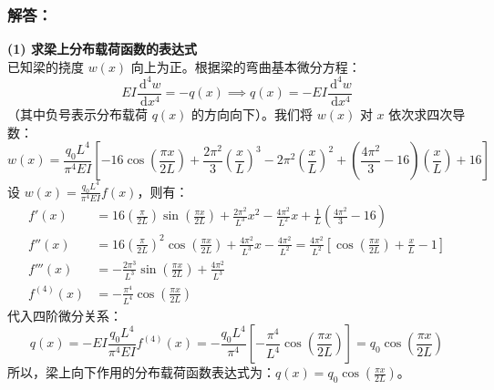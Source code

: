 \documentclass[11pt,a4paper]{ctexrep}
\newcommand{\diff}{\,\mathrm{d}}
\begin{document}
{\begin{center}
\end{center}

\subsubsection*{解答：}

\textbf{(1) 求梁上分布载荷函数的表达式} \\
已知梁的挠度 $w(x)$ 向上为正。根据梁的弯曲基本微分方程：
\[
    EI \frac{\diff^4 w}{\diff x^4} = -q(x) \implies q(x) = -EI \frac{\diff^4 w}{\diff x^4}
\]
（其中负号表示分布载荷 $q(x)$ 的方向向下）。我们将 $w(x)$ 对 $x$ 依次求四次导数：
\[
    w(x) = \frac{q_0 L^4}{\pi^4 EI} \left[ -16 \cos\left(\frac{\pi x}{2L}\right) + \frac{2\pi^2}{3}\left(\frac{x}{L}\right)^3 - 2\pi^2\left(\frac{x}{L}\right)^2 + \left(\frac{4\pi^2}{3} - 16\right)\left(\frac{x}{L}\right) + 16 \right]
\]
设 $w(x) = \frac{q_0 L^4}{\pi^4 EI} f(x)$，则有：
\begin{align*}
    f'(x) &= 16 \left(\frac{\pi}{2L}\right) \sin\left(\frac{\pi x}{2L}\right) + \frac{2\pi^2}{L^3} x^2 - \frac{4\pi^2}{L^2} x + \frac{1}{L}\left(\frac{4\pi^2}{3} - 16\right) \\
    f''(x) &= 16 \left(\frac{\pi}{2L}\right)^2 \cos\left(\frac{\pi x}{2L}\right) + \frac{4\pi^2}{L^3} x - \frac{4\pi^2}{L^2} = \frac{4\pi^2}{L^2}\left[ \cos\left(\frac{\pi x}{2L}\right) + \frac{x}{L} - 1 \right] \\
    f'''(x) &= -\frac{2\pi^3}{L^3} \sin\left(\frac{\pi x}{2L}\right) + \frac{4\pi^2}{L^3} \\
    f^{(4)}(x) &= -\frac{\pi^4}{L^4} \cos\left(\frac{\pi x}{2L}\right)
\end{align*}
代入四阶微分关系：
\[
    q(x) = -EI \frac{q_0 L^4}{\pi^4 EI} f^{(4)}(x) = -\frac{q_0 L^4}{\pi^4} \left[ -\frac{\pi^4}{L^4} \cos\left(\frac{\pi x}{2L}\right) \right] = q_0 \cos\left(\frac{\pi x}{2L}\right)
\]
所以，梁上向下作用的分布载荷函数表达式为：\textbf{$q(x) = q_0 \cos\left(\frac{\pi x}{2L}\right)$}。

}
\end{document}
